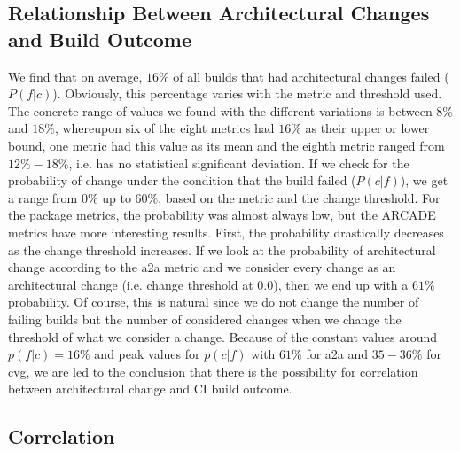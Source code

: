 \documentclass[sigconf, anonymous, review]{acmart}
\begin{document}
\subsection{Relationship Between Architectural Changes and Build Outcome}

We find that on average, $16\%$ of all builds that had architectural changes failed ($P(f|c)$). Obviously, this percentage varies with the metric and threshold used. The concrete range of values we found with the different variations is between $8\%$ and $18\%$, whereupon six of the eight metrics had $16\%$ as their upper or lower bound, one metric had this value as its mean and the eighth metric ranged from $12\%-18\%$, i.e. has no statistical significant deviation.
If we check for the probability of change under the condition that the build failed ($P(c|f)$), we get a range from $0\%$ up to $60\%$, based on the metric and the change threshold. For the package metrics, the probability was almost always low, but the ARCADE metrics have more interesting results. First, the probability drastically decreases as the change threshold increases. If we look at the probability of architectural change according to the a2a metric and we consider every change as an architectural change (i.e. change threshold at $0.0$), then we end up with a $61\%$ probability. Of course, this is natural since we do not change the number of failing builds but the number of considered changes when we change the threshold of what we consider a change. 
Because of the constant values around $p(f|c) = 16\%$ and peak values for $p(c|f)$ with $61\%$ for a2a and $35-36\%$ for cvg, we are led to the conclusion that there is the possibility for correlation between architectural change and CI build outcome.

\subsection{Correlation}


\end{document}
